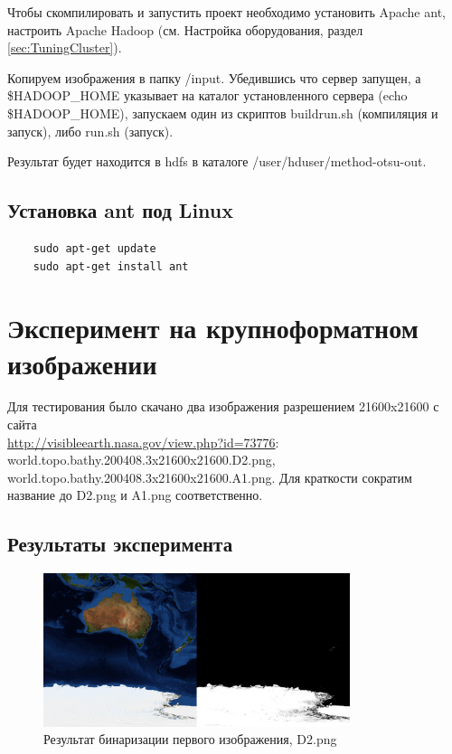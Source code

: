 \documentclass[12pt,a4paper]{extarticle} %
\begin{document}
    Чтобы скомпилировать и запустить проект необходимо установить Apache ant, настроить Apache Hadoop (см. Настройка оборудования, раздел \ref{sec:TuningCluster}).

    Копируем изображения в папку /input. Убедившись что сервер запущен, а \$HADOOP\_HOME указывает на каталог установленного сервера (echo \$HADOOP\_HOME), запускаем один из скриптов buildrun.sh (компиляция и запуск), либо run.sh (запуск).

    Результат будет находится в hdfs в каталоге /user/hduser/method-otsu-out.

\subsection{Установка ant под Linux}
\begin{lstlisting}
    sudo apt-get update 
    sudo apt-get install ant
\end{lstlisting}

\newpage
\section{Эксперимент на крупноформатном изображении}


	Для тестирования было скачано два изображения разрешением 21600x21600 с сайта\\ \href{http://visibleearth.nasa.gov/view.php?id=73776}{http://visibleearth.nasa.gov/view.php?id=73776}: world.topo.bathy.200408.3x21600x21600.D2.png, world.topo.bathy.200408.3x21600x21600.A1.png. Для краткости сократим название до D2.png и A1.png соответственно.

\subsection{Результаты эксперимента}

\begin{figure}[h]
    \centering
    \includegraphics[width=0.8\textwidth]{images/austr.png}
	\caption{Результат бинаризации первого изображения, D2.png}
\end{figure}
\end{document}

